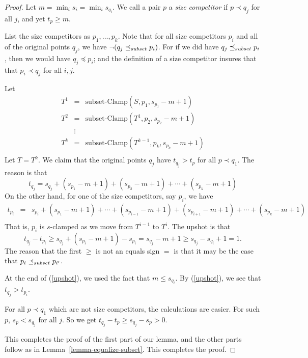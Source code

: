 \documentclass[12pt]{article}
\theoremstyle{definition}
\newcommand{\nott}{\neg}
\newcommand{\sClamp}{\mbox{subset-Clamp}}
\newcommand{\precsubseteq}{\preceq_{\scriptsize subset}}
\begin{document}
 \begin{proof}
 Let $m =  \min_i s_{i} = \min_i s_{q_i}$.
We call a pair $p$ a \emph{size competitor} if 
$p\prec q_j$ for all $j$, and yet  $t_p \geq m$.
 
List the size competitors as $p_1, \ldots, p_k$. 
 Note that for all size competitors $p_i$ and all of the original points
 $q_j$,  we have $\nott (q_j \precsubseteq p_i)$.
For if we did have $q_j \precsubseteq p_i$, then we would have 
$q_j \preceq p_i$; and the definition of a size competitor
insures that that $p_i \prec q_j$ for all $i, j$.


 Let \[ \begin{array}{lcl}
 T^1  & = &  \sClamp(S,p_1,  s_{p_1} -m + 1)\\

T^2 & = & \sClamp(T^1,p_2,  s_{p_2}-m + 1 )\\
  & \vdots   & \\
T^{k} & = & \sClamp(T^{k-1},p_k, s_{p_k}-m + 1 )\\
\end{array}
\]
Let $T = T^{k}$.
We claim that the original points $q_j$ have $t_{q_j} > t_{p}$
for all $p \prec q_1$.
The reason is that 
\[ t_{q_j} = s_{q_j} + ( s_{p_1} -m + 1) + (s_{p_2}-m + 1) + \cdots 
+ ( s_{p_k} -m + 1)
\]
On the other hand, for one of the size competitors, say $p_i$, we have
\begin{equation}
\label{nearendsubset}
\begin{array}{lcl}
t_{p_i} & = & s_{p_i} + ( s_{p_1}-m  + 1) + \cdots +
(s_{p_{i-1}} -m  + 1)
+ (s_{p_{i+1}} -m  + 1) + \cdots +(s_{p_k}-m + 1)\\
\end{array}
\end{equation}
That is, $p_i$ is $s$-clamped as we move from $T^{i-1}$ to $T^i$.
The upshot is that 
\begin{equation}\label{upshot}
t_{q_j} - t_{p_i} \geq s_{q_j} + (s_{p_i}-m + 1)  -
s_{p_i} = s_{q_j} - m + 1
\geq  s_{q_j} -s_{q_i} +1  = 1.
\end{equation}
The reason that the first $\geq$ is not an equals sign $=$
is that it may be the case that $p_i\precsubseteq p_{i'}$.

At the end of (\ref{upshot}), we used the fact that $m \leq s_{q_i}$.
By (\ref{upshot}), we see that $t_{q_j} > t_{p_i}$.


For all $p \prec q_1$ which are not  size competitors,
the calculations are easier.  For such $p$,
$s_p < s_{q_j}$ for all $j$.
So we get 
$t_{q_j} - t_{p} \geq s_{q_j} - s_{p} > 0$.


This completes the proof of the first part of our lemma, and the other parts follow as in Lemma~\ref{lemma-equalize-subset}.
This completes the proof.
\end{proof}
\end{document}

